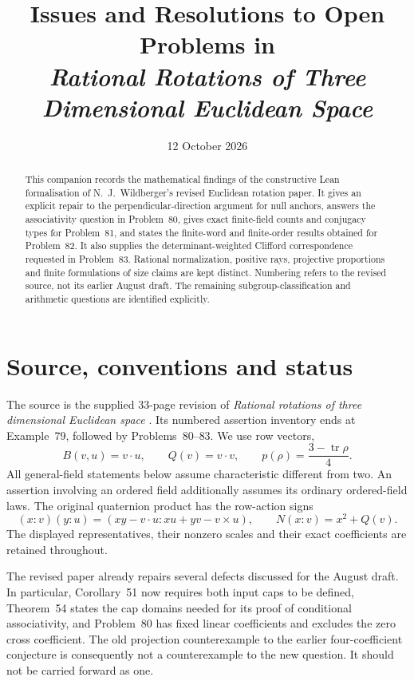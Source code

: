 \documentclass[11pt]{article}
\title{Issues and Resolutions to Open Problems in\\
  \emph{Rational Rotations of Three Dimensional Euclidean Space}}
\author{}
\date{12 October 2026}
\newcommand{\tr}{\operatorname{tr}}
\theoremstyle{remark}
\begin{document}
\maketitle
\begin{abstract}
This companion records the mathematical findings of the constructive Lean
formalisation of N.~J.~Wildberger's revised Euclidean rotation paper.
It gives an explicit repair to the
perpendicular-direction argument for null anchors, answers the
associativity question in Problem~80, gives exact finite-field counts and
conjugacy types for Problem~81, and states the finite-word and finite-order
results obtained for Problem~82. It also supplies the determinant-weighted
Clifford correspondence requested in Problem~83. Rational normalization,
positive rays, projective proportions and finite formulations of size claims
are kept distinct. Numbering refers to the revised source, not its earlier
August draft. The remaining subgroup-classification and arithmetic questions
are identified explicitly.
\end{abstract}

\section{Source, conventions and status}

The source is the supplied 33-page revision of \emph{Rational rotations of
three dimensional Euclidean space} \cite{source}. Its numbered assertion
inventory ends at Example~79, followed by Problems~80--83. We use row vectors,
\[
 B(v,u)=v\cdot u,\qquad Q(v)=v\cdot v,
 \qquad p(\rho)=\frac{3-\tr\rho}{4}.
\]
All general-field statements below assume characteristic different from two.
An assertion involving an ordered field additionally assumes its ordinary
ordered-field laws. The original quaternion product has the row-action signs
\begin{equation}
 (x:v)(y:u)=(xy-v\cdot u:xu+yv-v\times u),
 \qquad N(x:v)=x^2+Q(v).
 \label{eq:quaternion}
\end{equation}
The displayed representatives, their nonzero scales and their exact
coefficients are retained throughout.

The revised paper already repairs several defects discussed for the August
draft. In particular, Corollary~51 now requires both input caps to be defined,
Theorem~54 states the cap domains needed for its proof of conditional
associativity, and Problem~80 has fixed linear coefficients and excludes the
zero cross coefficient. The old projection counterexample to the earlier
four-coefficient conjecture is consequently not a counterexample to the new
question. It should not be carried forward as one.
\end{document}
